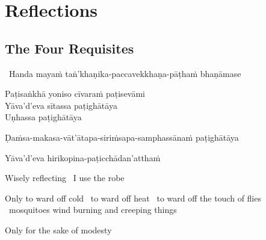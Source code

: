 
\ifdigital
\fi

\ifninebythirteen
\fi

\ifbfive
\fi

\chapter{Reflections}

\ifbfive
\fi

\ifninebythirteen
  \fi



\section{The Four Requisites}
\label{four-requisites}

\begin{leader}
  \anglebracketleft\ \hspace{-0.5mm}Handa mayaṁ taṅ'khaṇika-paccavekkhaṇa-pāṭhaṁ bhaṇāmase \hspace{-0.5mm}\anglebracketright\
\end{leader}

Paṭisaṅkhā yoniso cīvaraṁ paṭisevāmi\\
Yāva'd'eva sītassa paṭighātāya\\
Uṇhassa paṭighātāya\\
\begin{pali-hang-together}
Ḍaṁsa-makasa-vāt'ātapa-siriṁsapa-samphassānaṁ paṭighātāya\\
\end{pali-hang-together}
\begin{pali-hang-together}
Yāva'd'eva hirikopina-paṭicchādan'atthaṁ
\end{pali-hang-together}

\begin{english-keep-with}
  Wisely reflecting \breathmark\ I use the robe
  \begin{english-hang-together}
    Only to ward off cold \breathmark\ to ward off heat \breathmark\ to ward off the touch of flies \breathmark\ mosquitoes wind burning and creeping things
  \end{english-hang-together}
  Only for the sake of modesty
\end{english-keep-with}

